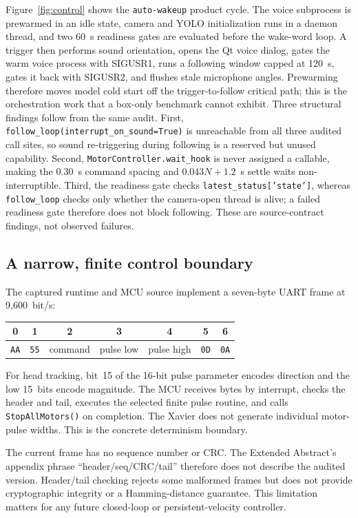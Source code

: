 \documentclass[conference]{IEEEtran}
\newcommand{\code}[1]{\texttt{#1}}
\begin{document}


Figure~\ref{fig:control} shows the \code{auto-wakeup} product cycle. The voice subprocess is prewarmed in an idle state, camera and YOLO initialization runs in a daemon thread, and two 60~s readiness gates are evaluated before the wake-word loop. A trigger then performs sound orientation, opens the Qt voice dialog, gates the warm voice process with SIGUSR1, runs a following window capped at 120~s, gates it back with SIGUSR2, and flushes stale microphone angles. Prewarming therefore moves model cold start off the trigger-to-follow critical path; this is the orchestration work that a box-only benchmark cannot exhibit. Three structural findings follow from the same audit. First, \code{follow\_loop(interrupt\_on\_sound=True)} is unreachable from all three audited call sites, so sound re-triggering during following is a reserved but unused capability. Second, \code{MotorController.wait\_hook} is never assigned a callable, making the 0.30~s command spacing and $0.043N+1.2$~s settle waits non-interruptible. Third, the readiness gate checks \code{latest\_status['state']}, whereas \code{follow\_loop} checks only whether the camera-open thread is alive; a failed readiness gate therefore does not block following. These are source-contract findings, not observed failures.

\subsection{A narrow, finite control boundary}
The captured runtime and MCU source implement a seven-byte UART frame at 9,600~bit/s:
\begin{center}
\small
\begin{tabular}{ccccccc}
\toprule
0 & 1 & 2 & 3 & 4 & 5 & 6\\
\midrule
\code{AA} & \code{55} & command & pulse low & pulse high & \code{0D} & \code{0A}\\
\bottomrule
\end{tabular}
\end{center}

For head tracking, bit~15 of the 16-bit pulse parameter encodes direction and the low 15~bits encode magnitude. The MCU receives bytes by interrupt, checks the header and tail, executes the selected finite pulse routine, and calls \code{StopAllMotors()} on completion. The Xavier does not generate individual motor-pulse widths. This is the concrete determinism boundary.

The current frame has no sequence number or CRC. The Extended Abstract's appendix phrase ``header/seq/CRC/tail'' therefore does not describe the audited version. Header/tail checking rejects some malformed frames but does not provide cryptographic integrity or a Hamming-distance guarantee. This limitation matters for any future closed-loop or persistent-velocity controller.
\end{document}
